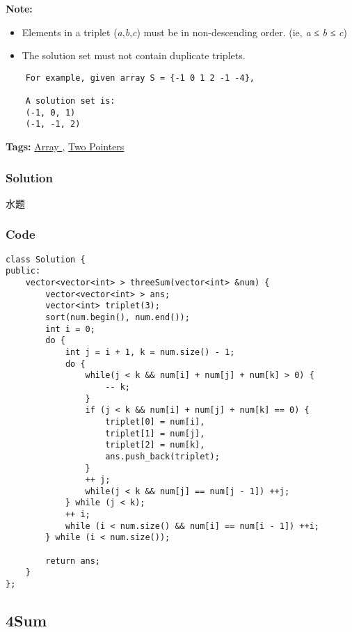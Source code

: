 \documentclass{article}
\begin{document}
\begin{CJK*}{UTF8}{gkai}
\textbf{Note:}



\begin{itemize}
\item Elements in a triplet (\emph{a},\emph{b},\emph{c}) must be in non-descending order. (ie, \emph{a} ≤ \emph{b} ≤ \emph{c})
\item The solution set must not contain duplicate triplets.
\end{itemize}

\begin{verbatim}
    For example, given array S = {-1 0 1 2 -1 -4},

    A solution set is:
    (-1, 0, 1)
    (-1, -1, 2)
\end{verbatim}

\textbf{Tags: }
\hyperref[ Array ]{ Array },  \hyperref[ Two Pointers ]{ Two Pointers }



\subsubsection*{Solution}
水题

\subsubsection*{Code}
\begin{lstlisting}
class Solution {
public:
    vector<vector<int> > threeSum(vector<int> &num) {
        vector<vector<int> > ans;
        vector<int> triplet(3);
        sort(num.begin(), num.end());
        int i = 0;
        do {
            int j = i + 1, k = num.size() - 1;
            do {
                while(j < k && num[i] + num[j] + num[k] > 0) {
                    -- k;
                } 
                if (j < k && num[i] + num[j] + num[k] == 0) {
                    triplet[0] = num[i], 
                    triplet[1] = num[j], 
                    triplet[2] = num[k], 
                    ans.push_back(triplet);
                }
                ++ j;
                while(j < k && num[j] == num[j - 1]) ++j;
            } while (j < k);
            ++ i;
            while (i < num.size() && num[i] == num[i - 1]) ++i;
        } while (i < num.size());
        
        return ans;
    }
}; 
\end{lstlisting}


\subsection{ 4Sum }
\label{ 4Sum }


\end{CJK*}
\end{document}
